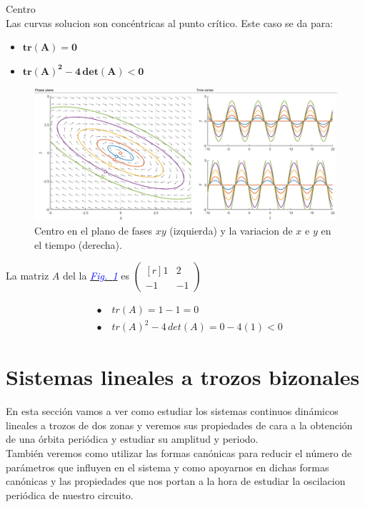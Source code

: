 \documentclass[12pt,a4paper]{report} %
\newcommand{\fref}[1]{\hyperref[#1]{\textcolor{blue}{\textit{Fig.~\ref*{#1}}}}}
\begin{document}
	\newpage
	
    {\Large\textbullet\quad Centro}\\[0.5cm]
    
    Las curvas solucion son concéntricas al punto crítico. Este caso se da para: 
    \begin{itemize}
    	\item $\bm{tr(A)=0}$
    	\item $\bm{tr(A)^2-4\,det(A)<0}$
    \end{itemize}
    
    \begin{figure}[h]
    	\centering
    	\includegraphics[width=1\textwidth]{centro.png}
    	\caption{Centro en el plano de fases $xy$ (izquierda) y la variacion de $x$ e $y$ en el tiempo (derecha).}
    	\label{fig:centro}
    \end{figure}\smallskip
    
    La matriz $A$ del la \fref{fig:centro} es 
    $\begin{pmatrix*}[r]
    	1 & 2 \\
    	-1 & -1
    \end{pmatrix*}$
    
    \begin{align*}
    	&\bullet\quad tr(A)=1-1=0 \\[2mm]
    	&\bullet\quad tr(A)^2-4\,det(A)=0-4(1)<0
    \end{align*}
	
	\newpage
	\section{Sistemas lineales a trozos bizonales}
	\label{sistrobiz}
	En esta sección vamos a ver como estudiar los sistemas continuos dinámicos lineales a trozos de dos zonas y veremos sus propiedades de cara a la obtención de una órbita periódica y estudiar su amplitud y periodo.\\[0.5cm] También veremos como utilizar las formas canónicas para reducir el número de parámetros que influyen en el sistema y como apoyarnos en dichas formas canónicas y las propiedades que nos portan a la hora de estudiar la oscilacion periódica de nuestro circuito.
	
\end{document}
